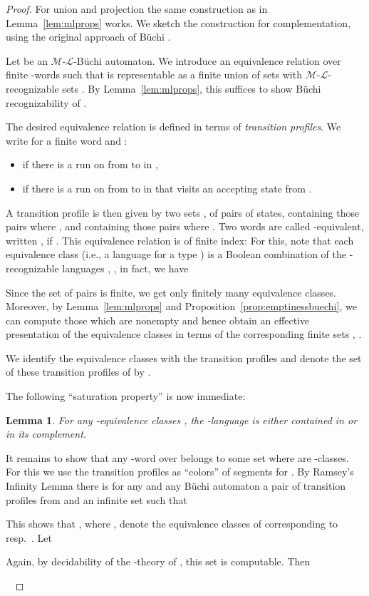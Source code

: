 \documentclass[copyright,creativecommons]{eptcs}
\newtheorem{lemma}[theorem]{Lemma}
\theoremstyle{plain}
\theoremstyle{nonumberplain}
\newtheorem{proof}{Proof}
\newcommand{\m}{\ensuremath{\mathcal{M}}}
\newcommand{\el}{\ensuremath{\mathcal{L}}}
\newcommand{\ml}{\ensuremath{\m\textrm{-}\el}}
\begin{document}
\begin{proof}
For union and projection the same construction as in Lemma~\ref{lem:mlprops} works. 
We sketch the construction for complementation, using the original 
approach of B\"uchi \cite{buc62}. 

Let  be an \ml-B\"uchi automaton.
We introduce an equivalence relation over finite -words such that 
 is representable as a finite union of 
sets  with \ml-recognizable sets . 
By Lemma~\ref{lem:mlprops}, this suffices to show B\"uchi recognizability of .

The desired equivalence relation is defined in terms of 
\emph{transition profiles}. We write for a finite word  and : 
\begin{itemize}
 \item  if there is a run on  from  to  in ,
 \item  if there is a run on  from  to  in  that visits an accepting state from .
\end{itemize}

A transition profile  is then given by two sets ,  of pairs of states,  containing those pairs  where , and  containing those pairs  where . Two words  are called -equivalent, written , if . This equivalence relation is of finite index: For this, note that each equivalence class (i.e., a language  for a type ) is a Boolean combination of the -recognizable languages 
, , in fact, we have


Since the set of pairs  is finite, we get only finitely many equivalence classes. Moreover, by Lemma~\ref{lem:mlprops} and Proposition~\ref{prop:emptinessbuechi}, we can compute those  which are nonempty and hence obtain an effective presentation of the equivalence classes in terms of the corresponding finite sets , .

We identify the equivalence classes with the transition profiles and denote the set of these transition profiles of  by . 
 
The following ``saturation property'' is now immediate: 

\begin{lemma}\label{saturation}
For any -equivalence classes , the -language 
 is either contained in  or in its 
complement.  
\end{lemma}

It remains to show that any -word over  belongs to some set 
 where  are -classes. For this we 
use the transition profiles as ``colors'' of segments  for . 
By Ramsey's Infinity Lemma \cite{ram30} there is for any  and any 
B\"uchi automaton  a pair of transition profiles  from 
 and an infinite set  such that 
 
This shows that , where ,  denote the equivalence classes of  corresponding to  resp.\ . 
Let  
 
Again, by decidability of the -theory of , this set is computable. 
Then 

\ 
\end{proof}
\end{document}
